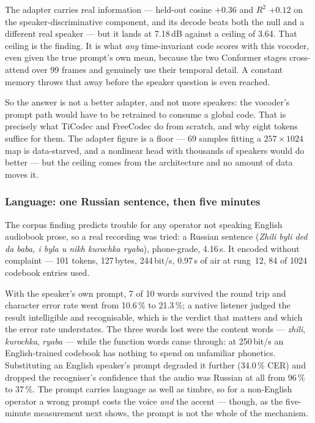 The adapter carries real information --- held-out cosine $+0.36$ and
$R^2$ $+0.12$ on the speaker-discriminative component, and its decode
beats both the null and a different real speaker --- but it lands at
7.18\,dB against a ceiling of 3.64.  That ceiling is the finding.  It is
what \emph{any} time-invariant code scores with this vocoder, even given
the true prompt's own mean, because the two Conformer stages cross-attend
over 99 frames and genuinely use their temporal detail.  A constant
memory throws that away before the speaker question is even reached.

So the answer is not a better adapter, and not more speakers: the
vocoder's prompt path would have to be retrained to consume a global
code.  That is precisely what TiCodec and FreeCodec do from scratch, and
why eight tokens suffice for them.  The adapter figure is a floor --- 69
samples fitting a $257 \times 1024$ map is data-starved, and a nonlinear
head with thousands of speakers would do better --- but the ceiling
comes from the architecture and no amount of data moves it.

\subsubsection{Language: one Russian sentence, then five minutes}

The corpus finding predicts trouble for any operator not speaking
English audiobook prose, so a real recording was tried: a Russian
sentence (\emph{Zhili byli ded da baba, i byla u nikh kurochka
ryaba}), phone-grade, 4.16\,s.  It encoded without complaint ---
101 tokens, 127\,bytes, 244\,bit/s, 0.97\,s of air at rung~12, 84 of
1024 codebook entries used.

With the speaker's own prompt, 7 of 10 words survived the round trip
and character error rate went from 10.6\,\% to 21.3\,\%; a native
listener judged the result intelligible and recognisable, which is the
verdict that matters and which the error rate understates.  The three
words lost were the content words --- \emph{zhili}, \emph{kurochka},
\emph{ryaba} --- while the function words came through: at 250\,bit/s
an English-trained codebook has nothing to spend on unfamiliar
phonetics.  Substituting an English speaker's prompt degraded it
further (34.0\,\% CER) and dropped the recogniser's confidence that
the audio was Russian at all from 96\,\% to 37\,\%.  The prompt
carries language as well as timbre, so for a non-English operator a
wrong prompt costs the voice \emph{and} the accent --- though, as the
five-minute measurement next shows, the prompt is not the whole of the
mechanism.

